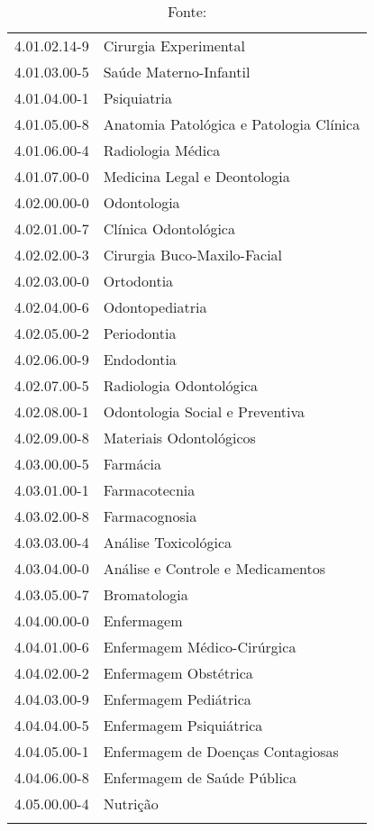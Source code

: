 \begin{longtable}[c]{p{2.15cm}p{13cm}}
4.01.02.14-9 & Cirurgia Experimental \\
4.01.03.00-5 & Saúde Materno-Infantil \\
4.01.04.00-1 & Psiquiatria \\
4.01.05.00-8 & Anatomia Patológica e Patologia Clínica \\
4.01.06.00-4 & Radiologia Médica \\
4.01.07.00-0 & Medicina Legal e Deontologia \\
4.02.00.00-0 & Odontologia \\
4.02.01.00-7 & Clínica Odontológica \\
4.02.02.00-3 & Cirurgia Buco-Maxilo-Facial \\
4.02.03.00-0 & Ortodontia \\
4.02.04.00-6 & Odontopediatria \\
4.02.05.00-2 & Periodontia \\
4.02.06.00-9 & Endodontia \\
4.02.07.00-5 & Radiologia Odontológica \\
4.02.08.00-1 & Odontologia Social e Preventiva \\
4.02.09.00-8 & Materiais Odontológicos \\
4.03.00.00-5 & Farmácia \\
4.03.01.00-1 & Farmacotecnia \\
4.03.02.00-8 & Farmacognosia \\
4.03.03.00-4 & Análise Toxicológica \\
4.03.04.00-0 & Análise e Controle e Medicamentos \\
4.03.05.00-7 & Bromatologia \\
4.04.00.00-0 & Enfermagem \\
4.04.01.00-6 & Enfermagem Médico-Cirúrgica \\
4.04.02.00-2 & Enfermagem Obstétrica \\
4.04.03.00-9 & Enfermagem Pediátrica \\
4.04.04.00-5 & Enfermagem Psiquiátrica \\
4.04.05.00-1 & Enfermagem de Doenças Contagiosas \\
4.04.06.00-8 & Enfermagem de Saúde Pública \\
4.05.00.00-4 & Nutrição \\

\caption*{Fonte: \cite{cnpq} }
\end{longtable}